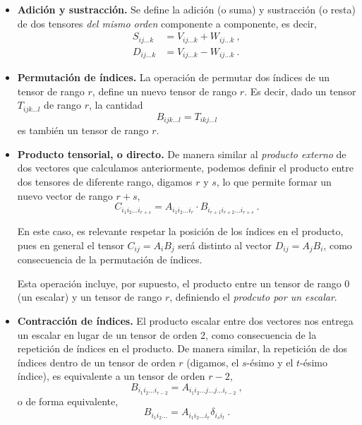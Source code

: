 \begin{itemize}
    \item \textbf{Adición y sustracción.} Se define la adición (o suma) y sustracción (o resta) de dos tensores \emph{del mismo orden} componente a componente, es decir,
    \begin{align}
        S_{ij \dots k} & = V_{ij \dots k} + W_{ij \dots k} \ , \\
        D_{ij \dots k} & = V_{ij \dots k} - W_{ij \dots k} \ .
    \end{align}
    \item \textbf{Permutación de índices.} La operación de permutar dos índices de un tensor de rango $r$, define un nuevo tensor de rango $r$. Es decir, dado un tensor $T_{ijk \dots l}$ de rango $r$, la cantidad
    \begin{equation}
        B_{ijk \dots l} = T_{ikj \dots l} 
    \end{equation}
    es también un tensor de rango $r$.

    \item \textbf{Producto tensorial, o directo.} De manera similar al \emph{producto externo} de dos vectores que calculamos anteriormente, podemos definir el producto entre dos tensores de diferente rango, digamos $r$ y $s$, lo que permite formar un nuevo vector de rango $r+s$,
    \begin{equation}
        C_{i_1 i_2 \dots i_{r+s}} = A_{i_1 i_2 \dots i_r} \cdot B_{i_{r+1} i_{r+2} \dots i_{r+s}} \ .
    \end{equation}
    
    En este caso, es relevante respetar la posición de los índices en el producto, pues en general el tensor $C_{ij} = A_i B_j$ será distinto al vector $D_{ij} = A_j B_i$, como consecuencia de la permutación de índices.

    Esta operación incluye, por supuesto, el producto entre un tensor de rango 0 (un escalar) y un tensor de rango $r$, definiendo el \emph{prodcuto por un escalar}.

    \item \textbf{Contracción de índices.} El producto escalar entre dos vectores nos entrega un escalar en lugar de un tensor de orden 2, como consecuencia de la repetición de índices en el producto. De manera similar, la repetición de dos índices dentro de un tensor de orden $r$ (digamos, el $s$-ésimo y el $t$-ésimo índice), es equivalente a un tensor de orden $r-2$,
    \begin{equation}
        B_{i_1 i_2 \dots i_{r-2}} = A_{i_1 i_2 \dots j \dots j \dots i_{r-2}} \ ,
    \end{equation}
    o de forma equivalente,
    \begin{equation}
        B_{i_1 i_2 \dots} = A_{i_1 i_2 \dots i_r} \delta_{i_s i_t} \ .
    \end{equation}


\end{itemize}
